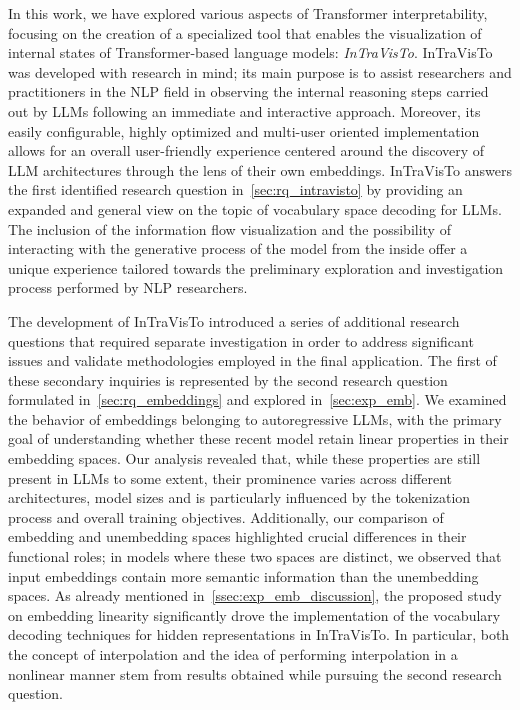 In this work, we have explored various aspects of Transformer interpretability, focusing on the creation of a specialized tool that enables the visualization of internal states of Transformer-based language models: \emph{InTraVisTo}.
InTraVisTo was developed with research in mind; its main purpose is to assist researchers and practitioners in the NLP field in observing the internal reasoning steps carried out by LLMs following an immediate and interactive approach.
Moreover, its easily configurable, highly optimized and multi-user oriented implementation allows for an overall user-friendly experience centered around the discovery of LLM architectures through the lens of their own embeddings.
InTraVisTo answers the first identified research question in~\cref{sec:rq_intravisto} by providing an expanded and general view on the topic of vocabulary space decoding for LLMs.
The inclusion of the information flow visualization and the possibility of interacting with the generative process of the model from the inside offer a unique experience tailored towards the preliminary exploration and investigation process performed by NLP researchers.

The development of InTraVisTo introduced a series of additional research questions that required separate investigation in order to address significant issues and validate methodologies employed in the final application.
The first of these secondary inquiries is represented by the second research question formulated in~\cref{sec:rq_embeddings} and explored in~\cref{sec:exp_emb}.
We examined the behavior of embeddings belonging to autoregressive LLMs, with the primary goal of understanding whether these recent model retain linear properties in their embedding spaces.
Our analysis revealed that, while these properties are still present in LLMs to some extent, their prominence varies across different architectures, model sizes and is particularly influenced by the tokenization process and overall training objectives.
Additionally, our comparison of embedding and unembedding spaces highlighted crucial differences in their functional roles; in models where these two spaces are distinct, we observed that input embeddings contain more semantic information than the unembedding spaces.
As already mentioned in~\cref{ssec:exp_emb_discussion}, the proposed study on embedding linearity significantly drove the implementation of the vocabulary decoding techniques for hidden representations in InTraVisTo.
In particular, both the concept of interpolation and the idea of performing interpolation in a nonlinear manner stem from results obtained while pursuing the second research question.

